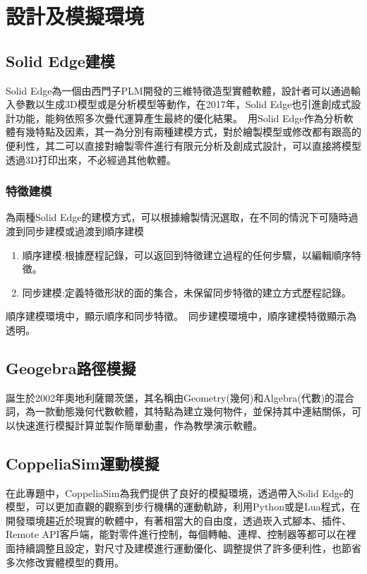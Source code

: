 \chapter{設計及模擬環境}

\section{Solid Edge建模}
Solid Edge為一個由西門子PLM開發的三維特徵造型實體軟體，設計者可以通過輸入參數以生成3D模型或是分析模型等動作，在2017年，Solid Edge也引進創成式設計功能，能夠依照多次疊代運算產生最終的優化結果。\
用Solid Edge作為分析軟體有幾特點及因素，其一為分別有兩種建模方式，對於繪製模型或修改都有跟高的便利性，其二可以直接對繪製零件進行有限元分析及創成式設計，可以直接將模型透過3D打印出來，不必經過其他軟體。\\
\subsection{特徵建模}
為兩種Solid Edge的建模方式，可以根據繪製情況選取，在不同的情況下可隨時過渡到同步建模或過渡到順序建模
\begin{enumerate}
\item 順序建模:根據歷程記錄，可以返回到特徵建立過程的任何步驟，以編輯順序特徵。
\item 同步建模:定義特徵形狀的面的集合，未保留同步特徵的建立方式歷程記錄。
\end{enumerate}
順序建模環境中，顯示順序和同步特徵。\
同步建模環境中，順序建模特徵顯示為透明。\\

\section{Geogebra路徑模擬}
誕生於2002年奧地利薩爾茨堡，其名稱由Geometry(幾何)和Algebra(代數)的混合詞，為一款動態幾何代數軟體，其特點為建立幾何物件，並保持其中連結關係，可以快速進行模擬計算並製作簡單動畫，作為教學演示軟體。\\

\section{CoppeliaSim運動模擬}
在此專題中，CoppeliaSim為我們提供了良好的模擬環境，透過帶入Solid Edge的模型，可以更加直觀的觀察到步行機構的運動軌跡，利用Python或是Lua程式，在開發環境趨近於現實的軟體中，有著相當大的自由度，透過崁入式腳本、插件、Remote API客戶端，能對零件進行控制，每個轉軸、連桿、控制器等都可以在裡面持續調整且設定，對尺寸及建模進行運動優化、調整提供了許多便利性，也節省多次修改實體模型的費用。\\

